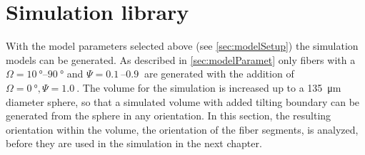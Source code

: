 \section{Simulation library}
% 
With the model parameters selected above (see \cref{sec:modelSetup}) the simulation models can be generated.
As described in \cref{sec:modelParamet} only fibers with a $\Omega = \SIrange{10}{90}{\degree}$ and $\Psi = \SIrange{0.1}{0.9}{}$ are generated with the addition of $\Omega=\SI{0}{\degree}, \Psi=\SI{1.0}{}$.
The volume for the simulation is increased up to a \SI{135}{\micro\meter} diameter sphere, so that a simulated volume with added tilting boundary can be generated from the sphere in any orientation.
In this section, the resulting orientation within the volume, \ie{} the orientation of the fiber segments, is analyzed, before they are used in the simulation in the next chapter.
% 
% 
% 
